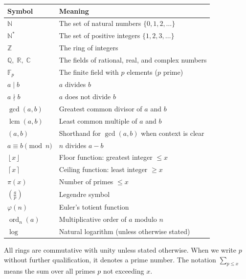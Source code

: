 \documentclass[12pt,a4paper,openany]{book}
\theoremstyle{definition}
\theoremstyle{plain}
\theoremstyle{remark}
\newcommand{\N}{\mathbb{N}}
\newcommand{\Z}{\mathbb{Z}}
\newcommand{\Q}{\mathbb{Q}}
\newcommand{\R}{\mathbb{R}}
\newcommand{\C}{\mathbb{C}}
\newcommand{\F}{\mathbb{F}}
\newcommand{\floor}[1]{\left\lfloor #1 \right\rfloor}
\newcommand{\ceil}[1]{\left\lceil #1 \right\rceil}
\newcommand{\legendre}[2]{\left(\frac{#1}{#2}\right)}
\DeclareMathOperator{\lcm}{lcm}
\DeclareMathOperator{\ord}{ord}
\begin{document}
\begin{center}
\renewcommand{\arraystretch}{1.35}
\begin{tabular}{>{\raggedright}p{3.8cm} p{9cm}}
\toprule
\textbf{Symbol} & \textbf{Meaning} \\
\midrule
$\N$ & The set of natural numbers $\{0,1,2,\ldots\}$ \\
$\N^{*}$ & The set of positive integers $\{1,2,3,\ldots\}$ \\
$\Z$ & The ring of integers \\
$\Q,\;\R,\;\C$ & The fields of rational, real, and complex numbers \\
$\F_p$ & The finite field with $p$ elements ($p$ prime) \\
$a \mid b$ & $a$ divides $b$ \\
$a \nmid b$ & $a$ does not divide $b$ \\
$\gcd(a,b)$ & Greatest common divisor of $a$ and $b$ \\
$\lcm(a,b)$ & Least common multiple of $a$ and $b$ \\
$(a,b)$ & Shorthand for $\gcd(a,b)$ when context is clear \\
$a \equiv b \pmod{n}$ & $n$ divides $a-b$ \\
$\floor{x}$ & Floor function: greatest integer $\leq x$ \\
$\ceil{x}$ & Ceiling function: least integer $\geq x$ \\
$\pi(x)$ & Number of primes $\leq x$ \\
$\legendre{a}{p}$ & Legendre symbol \\
$\varphi(n)$ & Euler's totient function \\
$\ord_n(a)$ & Multiplicative order of $a$ modulo $n$ \\
$\log$ & Natural logarithm (unless otherwise stated) \\
\bottomrule
\end{tabular}
\end{center}

\medskip
\noindent
All rings are commutative with unity unless stated otherwise.
When we write $p$ without further qualification, it denotes a prime number.
The notation $\sum_{p \le x}$ means the sum over all primes $p$ not exceeding $x$.

\tableofcontents

\mainmatter

\end{document}
